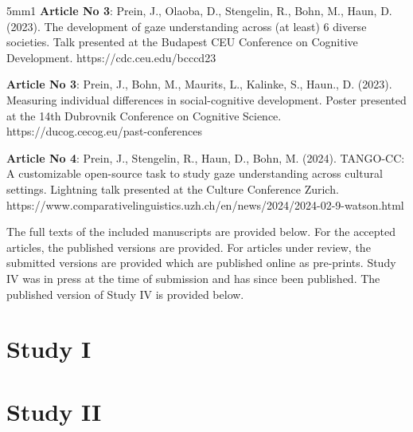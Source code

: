 \documentclass[
]{scrbook}
\begin{document}
\begin{hangparas}{5mm}{1}
\textbf{Article No 3}: Prein, J., Olaoba, D., Stengelin, R., Bohn, M., Haun, D. (2023). The development of gaze understanding across (at least) 6 diverse societies. Talk presented at the Budapest CEU Conference on Cognitive Development. https://cdc.ceu.edu/bcccd23

\textbf{Article No 3}: Prein, J., Bohn, M., Maurits, L., Kalinke, S., Haun., D. (2023). Measuring individual differences in social-cognitive development. Poster presented at the 14th Dubrovnik Conference on Cognitive Science. https://ducog.cecog.eu/past-conferences

\textbf{Article No 4}: Prein, J., Stengelin, R., Haun, D., Bohn, M. (2024). TANGO-CC: A customizable open-source task to study gaze understanding across cultural settings. Lightning talk presented at the Culture Conference Zurich. https://www.comparativelinguistics.uzh.ch/en/news/2024/2024-02-9-watson.html

\end{hangparas}

\vspace{150mm}

The full texts of the included manuscripts are provided below. For the accepted articles, the published versions are provided. For articles under review, the submitted versions are provided which are published online as pre-prints. Study IV was in press at the time of submission and has since been published. The published version of Study IV is provided below.

\newpage

\section*{Study I}\label{studyI}

\begin{minipage}{\textwidth}

\end{minipage}



\newpage

\section*{Study II}\label{studyII}

\begin{minipage}{\textwidth}

\end{minipage}
\end{document}
